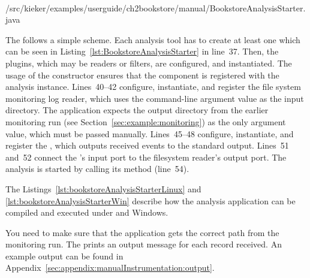 \

\setJavaCodeListing
%
{\manualInstrumentedBookstoreApplicationDir/src/kieker/examples/userguide/ch2bookstore/manual/BookstoreAnalysisStarter.java}

\pagebreak

\noindent The  follows a simple scheme. Each %
analysis tool has to create at least one  which can be %
seen in Listing~\ref{lst:BookstoreAnalysisStarter} in line~37. Then, the plugins, %
which may be readers or filters, are configured, and instantiated. The usage of the  %
constructor ensures that the component is registered with the analysis instance. %
Lines~40--42 configure, instantiate, and register the file system monitoring %
log reader, which uses the command-line argument value as the input directory. %
The application expects the %
output directory from the earlier monitoring run (see Section~\ref{sec:example:monitoring}) %
as the only argument value, which must be passed manually. %
Lines~45--48 configure, instantiate, and register the , %
which outputs received events to the standard output. Lines~51 and~52 connect %
the 's input port to the filesystem reader's output port. %
The analysis is started by calling its  method (line~54). %


The Listings~\ref{lst:bookstoreAnalysisStarterLinux} and \ref{lst:bookstoreAnalysisStarterWin} %
describe how the analysis application can be compiled and executed under \UnixLikeSystems{} and Windows.

\setBashListing




\noindent You need to make sure that the application gets the correct path from the monitoring run.
The  prints an output message for each record received. %
An example output can be found in Appendix~\ref{sec:appendix:manualInstrumentation:output}.
